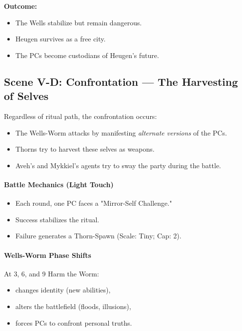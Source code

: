 \documentclass[11pt]{book}
\begin{document}
\textbf{Outcome:}
\begin{itemize}
    \item The Wells stabilize but remain dangerous.
    \item Heugen survives as a free city.
    \item The PCs become custodians of Heugen's future.
\end{itemize}

\subsection*{Scene V-D: Confrontation --- The Harvesting of Selves}

Regardless of ritual path, the confrontation occurs:

\begin{itemize}[leftmargin=*]
    \item The Wells-Worm attacks by manifesting \emph{alternate versions} of the PCs.
    \item Thorns try to harvest these selves as weapons.
    \item Aveh's and Mykkiel's agents try to sway the party during the battle.
\end{itemize}

\paragraph{Battle Mechanics (Light Touch)}
\begin{itemize}
    \item Each round, one PC faces a "Mirror-Self Challenge."
    \item Success stabilizes the ritual.
    \item Failure generates a Thorn-Spawn (Scale: Tiny; Cap: 2).
\end{itemize}

\paragraph{Wells-Worm Phase Shifts}
At 3, 6, and 9 Harm the Worm:
\begin{itemize}
    \item changes identity (new abilities),
    \item alters the battlefield (floods, illusions),
    \item forces PCs to confront personal truths.
\end{itemize}
\end{document}
